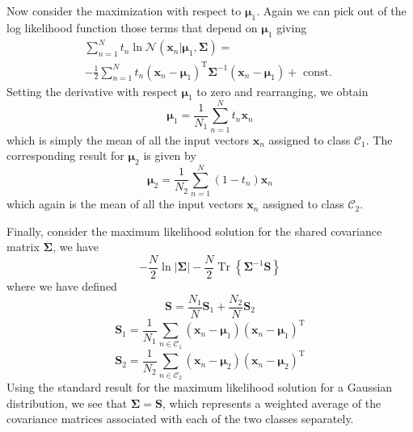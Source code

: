 \documentclass[5p,sort&compress]{elsarticle}
\begin{document}
Now consider the maximization with respect to $\boldsymbol{\mu}_1$. Again we can pick out of the log likelihood function those terms that depend on $\boldsymbol{\mu}_1$ giving
\begin{equation}
\begin{aligned}
\sum_{n=1}^{N} t_{n} \ln \mathcal{N}\left(\mathbf{x}_{n} | \boldsymbol{\mu}_{1}, \mathbf{\Sigma}\right)= \\
-\frac{1}{2} \sum_{n=1}^{N} t_{n}\left(\mathbf{x}_{n}-\boldsymbol{\mu}_{1}\right)^{\mathrm{T}} \boldsymbol{\Sigma}^{-1}\left(\mathbf{x}_{n}-\boldsymbol{\mu}_{1}\right)+\text { const. }
\end{aligned}
\end{equation}
Setting the derivative with respect $\boldsymbol{\mu}_1$ to zero and rearranging, we obtain
\begin{equation}
\boldsymbol{\mu}_{1}=\frac{1}{N_{1}} \sum_{n=1}^{N} t_{n} \mathbf{x}_{n}
\end{equation}
which is simply the mean of all the input vectors $\mathbf{x}_{n}$ assigned to class $\mathcal{C}_1$. The corresponding result for $\boldsymbol{\mu}_2$ is given by
\begin{equation}
\boldsymbol{\mu}_{2}=\frac{1}{N_{2}} \sum_{n=1}^{N} (1-t_{n}) \mathbf{x}_{n}
\end{equation}
which again is the mean of all the input vectors $\mathbf{x}_{n}$ assigned to class $\mathcal{C}_2$.

Finally, consider the maximum likelihood solution for the shared covariance matrix $\mathbf{\Sigma}$, we have
\begin{equation}
-\frac{N}{2} \ln |\mathbf{\Sigma}|-\frac{N}{2} \operatorname{Tr}\left\{\mathbf{\Sigma}^{-1} \mathbf{S}\right\}
\end{equation}
where we have defined
\begin{equation}
\mathbf{S}=\frac{N_{1}}{N} \mathbf{S}_{1}+\frac{N_{2}}{N} \mathbf{S}_{2}
\end{equation}
\begin{equation}
\mathbf{S}_{1}=\frac{1}{N_{1}} \sum_{n \in \mathcal{C}_{1}}\left(\mathbf{x}_{n}-\boldsymbol{\mu}_{1}\right)\left(\mathbf{x}_{n}-\boldsymbol{\mu}_{1}\right)^{\mathrm{T}}
\end{equation}
\begin{equation}
\mathbf{S}_{2}=\frac{1}{N_{2}} \sum_{n \in \mathcal{C}_{2}}\left(\mathbf{x}_{n}-\boldsymbol{\mu}_{2}\right)\left(\mathbf{x}_{n}-\boldsymbol{\mu}_{2}\right)^{\mathrm{T}}
\end{equation}
Using the standard result for the maximum likelihood solution for a Gaussian distribution, we see that $\mathbf{\Sigma} = \mathbf{S}$, which represents a weighted average of the covariance matrices associated with each of the two classes separately.
\end{document}
